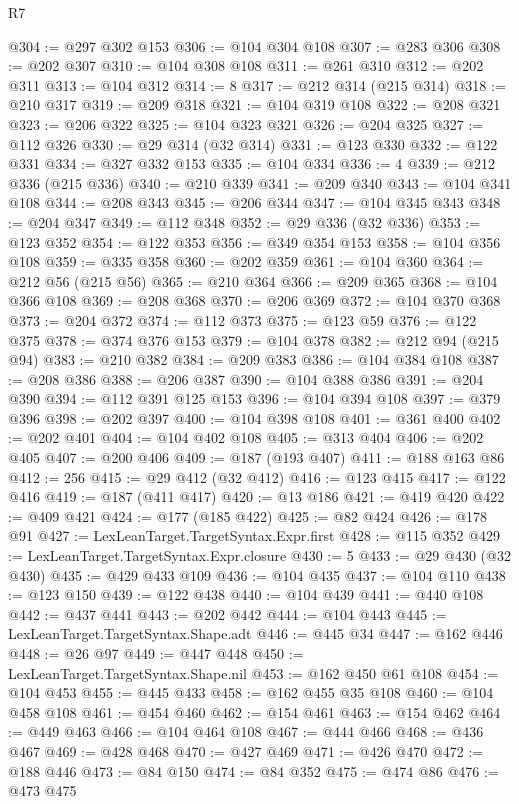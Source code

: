 \begin{lexlean}{R7}
\begin{coremodule}
@304 := @297 @302 @153
@306 := @104 @304 @108
@307 := @283 @306
@308 := @202 @307
@310 := @104 @308 @108
@311 := @261 @310
@312 := @202 @311
@313 := @104 @312
@314 := 8
@317 := @212 @314 (@215 @314)
@318 := @210 @317
@319 := @209 @318
@321 := @104 @319 @108
@322 := @208 @321
@323 := @206 @322
@325 := @104 @323 @321
@326 := @204 @325
@327 := @112 @326
@330 := @29 @314 (@32 @314)
@331 := @123 @330
@332 := @122 @331
@334 := @327 @332 @153
@335 := @104 @334
@336 := 4
@339 := @212 @336 (@215 @336)
@340 := @210 @339
@341 := @209 @340
@343 := @104 @341 @108
@344 := @208 @343
@345 := @206 @344
@347 := @104 @345 @343
@348 := @204 @347
@349 := @112 @348
@352 := @29 @336 (@32 @336)
@353 := @123 @352
@354 := @122 @353
@356 := @349 @354 @153
@358 := @104 @356 @108
@359 := @335 @358
@360 := @202 @359
@361 := @104 @360
@364 := @212 @56 (@215 @56)
@365 := @210 @364
@366 := @209 @365
@368 := @104 @366 @108
@369 := @208 @368
@370 := @206 @369
@372 := @104 @370 @368
@373 := @204 @372
@374 := @112 @373
@375 := @123 @59
@376 := @122 @375
@378 := @374 @376 @153
@379 := @104 @378
@382 := @212 @94 (@215 @94)
@383 := @210 @382
@384 := @209 @383
@386 := @104 @384 @108
@387 := @208 @386
@388 := @206 @387
@390 := @104 @388 @386
@391 := @204 @390
@394 := @112 @391 @125 @153
@396 := @104 @394 @108
@397 := @379 @396
@398 := @202 @397
@400 := @104 @398 @108
@401 := @361 @400
@402 := @202 @401
@404 := @104 @402 @108
@405 := @313 @404
@406 := @202 @405
@407 := @200 @406
@409 := @187 (@193 @407)
@411 := @188 @163 @86
@412 := 256
@415 := @29 @412 (@32 @412)
@416 := @123 @415
@417 := @122 @416
@419 := @187 (@411 @417)
@420 := @13 @186
@421 := @419 @420
@422 := @409 @421
@424 := @177 (@185 @422)
@425 := @82 @424
@426 := @178 @91
@427 := LexLeanTarget.TargetSyntax.Expr.first
@428 := @115 @352
@429 := LexLeanTarget.TargetSyntax.Expr.closure
@430 := 5
@433 := @29 @430 (@32 @430)
@435 := @429 @433 @109
@436 := @104 @435
@437 := @104 @110
@438 := @123 @150
@439 := @122 @438
@440 := @104 @439
@441 := @440 @108
@442 := @437 @441
@443 := @202 @442
@444 := @104 @443
@445 := LexLeanTarget.TargetSyntax.Shape.adt
@446 := @445 @34
@447 := @162 @446
@448 := @26 @97
@449 := @447 @448
@450 := LexLeanTarget.TargetSyntax.Shape.nil
@453 := @162 @450 @61 @108
@454 := @104 @453
@455 := @445 @433
@458 := @162 @455 @35 @108
@460 := @104 @458 @108
@461 := @454 @460
@462 := @154 @461
@463 := @154 @462
@464 := @449 @463
@466 := @104 @464 @108
@467 := @444 @466
@468 := @436 @467
@469 := @428 @468
@470 := @427 @469
@471 := @426 @470
@472 := @188 @446
@473 := @84 @150
@474 := @84 @352
@475 := @474 @86
@476 := @473 @475

\end{coremodule}
\end{lexlean}

